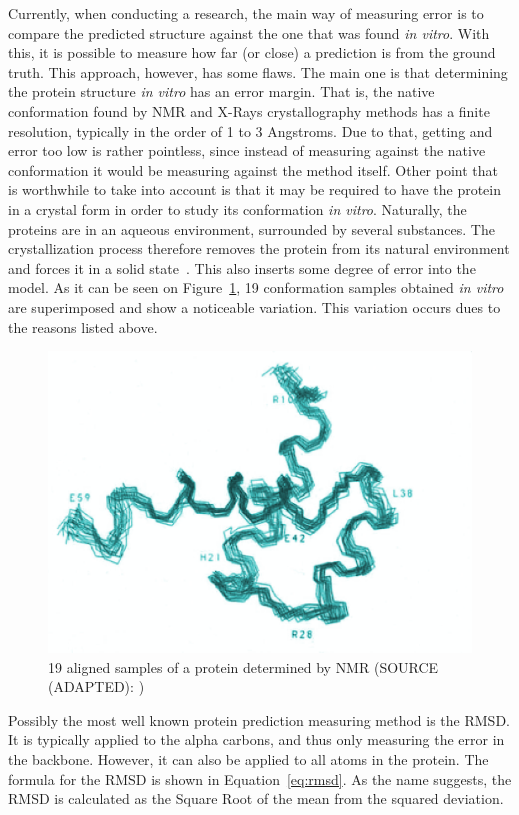Currently, when conducting a research, the main way of measuring error is to compare the predicted structure against the one that was found \textit{in vitro}. With this, it is possible to measure how far (or close) a prediction is from the ground truth. This approach, however, has some flaws. The main one is that determining the protein structure \textit{in vitro} has an error margin. That is, the native conformation found by \ac{NMR} and X-Rays crystallography methods has a finite resolution, typically in the order
of 1 to 3 Angstroms. Due to that, getting and error too low is rather
pointless, since instead of measuring against the native conformation
it would be measuring against the method itself. Other point that is
worthwhile to take into account is that it may be required to have the
protein in a crystal form in order to study its conformation
\textit{in vitro}. Naturally, the proteins are in an aqueous environment,
surrounded by several substances. The crystallization process therefore
removes the protein from its natural environment and forces it in a
solid state~\cite{wuthrich1989protein}.
This also inserts some degree of error into the model. As it can be seen
on Figure~\ref{fig:protein-error}, 19 conformation samples obtained
\textit{in vitro} are superimposed and show a noticeable variation.
This variation occurs dues to the reasons listed above.

\begin{figure}
    \centering
    \includegraphics[width=0.7\linewidth]{Figuras/protein-error.png}
    \caption{19 aligned samples of a protein determined by \ac{NMR} (SOURCE (ADAPTED): \cite{wuthrich1989protein})}
    \label{fig:protein-error}
\end{figure}

Possibly the most well known protein prediction measuring method is the \ac{RMSD}. It is typically applied to the alpha carbons, and thus only measuring the error in the backbone. However, it can also be applied to all atoms in the protein. The formula for the \ac{RMSD} is shown in Equation~\eqref{eq:rmsd}. As the name suggests, the \ac{RMSD} is calculated as the Square Root of the mean from the squared deviation.

